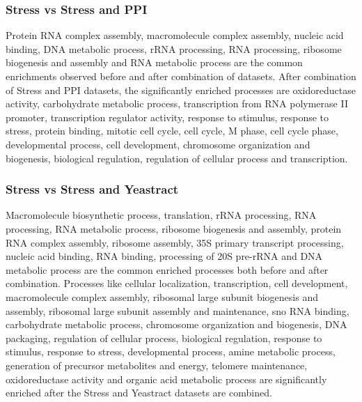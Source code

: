 \subsubsection{Stress vs Stress and PPI}
Protein RNA complex assembly, macromolecule complex assembly, nucleic acid binding, DNA metabolic process, rRNA processing, RNA processing, 
ribosome biogenesis and assembly and RNA metabolic process are the common enrichments observed before and after combination of datasets. 
After combination of Stress and PPI datasets, the significantly enriched processes are oxidoreductase activity, carbohydrate metabolic process, 
transcription from RNA polymerase II promoter, transcription regulator activity, response to stimulus, response to stress, protein binding, mitotic cell 
cycle, cell cycle, M phase, cell cycle phase, developmental process, cell development, chromosome organization and biogenesis, biological regulation, 
regulation of cellular process and transcription.

\subsubsection{Stress vs Stress and Yeastract}
Macromolecule biosynthetic process, translation, rRNA processing, RNA processing, RNA metabolic process, ribosome biogenesis and assembly, 
protein RNA complex assembly, ribosome  assembly, 35S primary transcript processing, nucleic acid binding, RNA binding, processing of 20S pre-rRNA and 
DNA metabolic process are the common enriched processes both before and after combination. Processes like cellular localization, transcription, 
cell development, macromolecule complex 
assembly, ribosomal large subunit biogenesis and assembly, ribosomal large subunit assembly and maintenance, sno RNA binding, carbohydrate 
metabolic process, chromosome organization and biogenesis, DNA packaging, regulation of cellular process, biological regulation, response to stimulus, 
response to stress, developmental process, amine metabolic process, generation of precursor metabolites and energy, telomere maintenance, 
oxidoreductase activity and organic acid metabolic process  are significantly enriched after the Stress and Yeastract datasets are combined.

